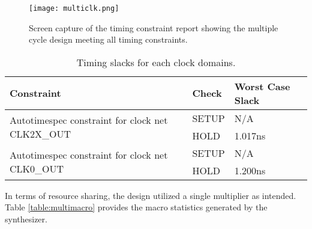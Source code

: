 \documentclass[paper=usletter, fontsize=12pt]{article}
\begin{document}
        \begin{figure}[ht]
            \begin{center}
                \texttt{[image: multiclk.png]}
                \caption{Screen capture of the timing constraint report showing
                the multiple cycle design meeting all timing constraints.}
                \label{fig:multiclk}
            \end{center}
        \end{figure}

        \begin{table}[h]
            \caption{Timing slacks for each clock domains.}
            \label{table:singslacks}
            \centering
            \begin{tabular}{ lm{5em}m{10em} }
\hline
\textbf{Constraint} & \textbf{Check}  &   \textbf{Worst Case Slack} \\
\hline
\multirow{ 2}{*}{Autotimespec constraint for clock net CLK2X\_OUT} & SETUP &
N/A \\
 & HOLD & 1.017ns \\
\multirow{ 2}{*}{Autotimespec constraint for clock net CLK0\_OUT} & SETUP &
N/A \\
 & HOLD & 1.200ns \\

\hline
            \end{tabular}
        \end{table}

        In terms of resource sharing, the design utilized a single multiplier
        as intended.  Table \ref{table:multimacro} provides the macro
        statistics generated by the synthesizer.
\end{document}
